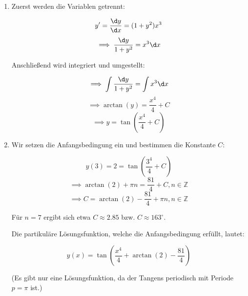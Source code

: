 \item 

\begin{enumerate}

\item Zuerst werden die Variablen getrennt:

$$y' = \frac{\d y}{\d x} = (1+y^2)x^3$$
$$\implies \frac{\d y}{1+y^2} = x^3 \d x$$

Anschließend wird integriert und umgestellt:

$$\implies \int \frac{\d y}{1+y^2} = \int x^3 \d x$$
$$\implies \arctan(y) = \frac{x^4}{4} + C$$
$$\implies y = \tan(\frac{x^4}{4} + C)$$

\item Wir setzen die Anfangsbedingung ein und bestimmen die Konstante $C$:

$$y(3) = 2 = \tan(\frac{3^4}{4} + C)$$
$$\implies \arctan(2) + \pi n= \frac{81}{4} + C, n \in \mathbb{Z}$$
$$\implies C = \arctan(2) - \frac{81}{4} + \pi n, n \in \mathbb{Z}$$

Für $n=7$ ergibt sich etwa $C \approx 2.85$ bzw. $C \approx 163^\circ$.

Die partikuläre Lösungsfunktion, welche die Anfangsbedingung erfüllt, lautet:

$$y(x) = \tan(\frac{x^4}{4} + \arctan(2) - \frac{81}{4})$$

(Es gibt nur eine Lösungsfunktion, da der Tangens periodisch mit Periode $p=\pi$ ist.)

\end{enumerate}

